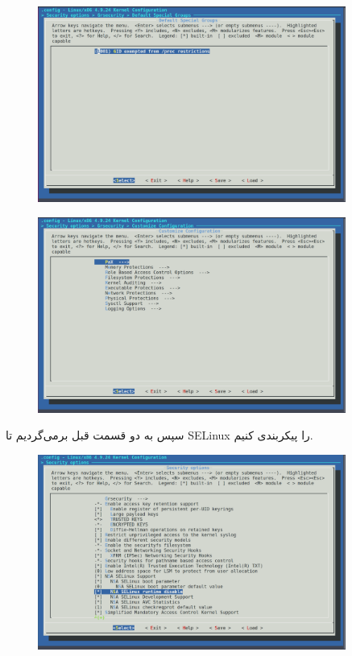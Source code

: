 \documentclass{article}
\begin{document}
\begin{enumerate}
\begin{figure}[ht]
\end{figure}
\newpage
\begin{figure}[ht]
	\centering	
	\includegraphics[width = 0.9\textwidth]{images/11.png}
\end{figure}
\begin{figure}[ht]
	\centering	
	\includegraphics[width = 0.9\textwidth]{images/12.png}
\end{figure}
\newpage
سپس به دو قسمت قبل برمی‌گردیم تا SELinux را پیکربندی کنیم.
\begin{figure}[ht]
	\centering	
	\includegraphics[width = 0.9\textwidth]{images/20.png}
\end{figure}


\end{enumerate}
\end{document}
